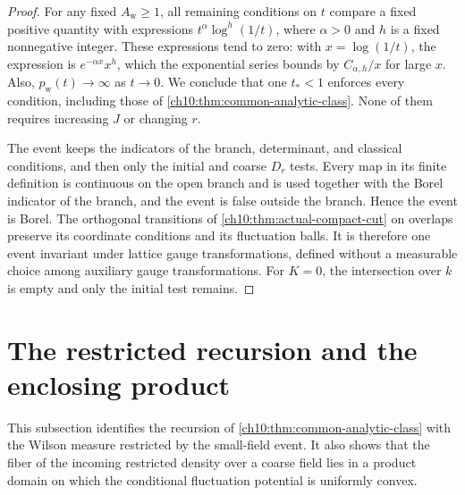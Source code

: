 \begin{proof}
For any fixed $A_{\mathrm w}\ge1$, all remaining conditions on $t$ compare a fixed positive quantity with expressions $t^\alpha\log^h(1/t)$, where $\alpha>0$ and $h$ is a fixed nonnegative integer. These expressions tend to zero: with $x=\log(1/t)$, the expression is $e^{-\alpha x}x^h$, which the exponential series bounds by $C_{\alpha,h}/x$ for large $x$. Also, $p_{\mathrm w}(t)\to\infty$ as $t\to0$. We conclude that one $t_*<1$ enforces every condition, including those of \cref{ch10:thm:common-analytic-class}. None of them requires increasing $J$ or changing $r$.

The event keeps the indicators of the branch, determinant, and classical conditions, and then only the initial and coarse $D_r$ tests. Every map in its finite definition is continuous on the open branch and is used together with the Borel indicator of the branch, and the event is false outside the branch. Hence the event is Borel. The orthogonal transitions of \cref{ch10:thm:actual-compact-cut} on overlaps preserve its coordinate conditions and its fluctuation balls. It is therefore one event invariant under lattice gauge transformations, defined without a measurable choice among auxiliary gauge transformations. For $K=0$, the intersection over $k$ is empty and only the initial test remains.
\end{proof}

\section{The restricted recursion and the enclosing product}\label{ch11:sec:recursion}

This subsection identifies the recursion of \cref{ch10:thm:common-analytic-class} with the Wilson measure restricted by the small-field event. It also shows that the fiber of the incoming restricted density over a coarse field lies in a product domain on which the conditional fluctuation potential is uniformly convex.

